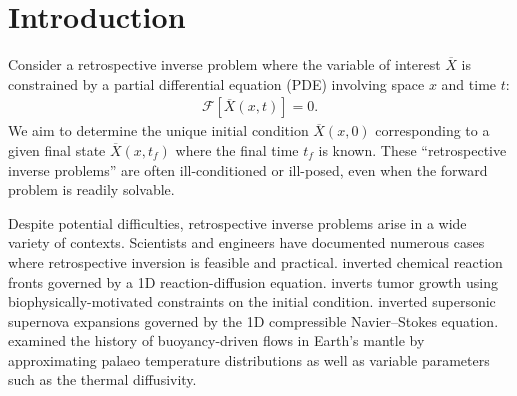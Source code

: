 \documentclass[%
 reprint,
 amsmath,amssymb,
 aps,
 pre,
]{revtex4-2}
\begin{document}
\maketitle

\section{Introduction}\label{secintro}

Consider a retrospective inverse problem where the variable of interest $\overline{X}$ is constrained by a partial differential equation (PDE) involving space $x$ and time $t$:
\begin{align}
  \mathcal{F}[\overline{X}(x, t)] = 0 \label{genintro}.
\end{align}
We aim to determine the unique initial condition $\overline{X}(x, 0)$ corresponding to a given final state $\overline{X}(x, t_f)$ where the final time $t_f$ is known.
These ``retrospective inverse problems'' are often ill-conditioned or ill-posed, even when the forward problem is readily solvable.

Despite potential difficulties, retrospective inverse problems arise in a wide variety of contexts.
Scientists and engineers have documented numerous cases where retrospective inversion is feasible and practical.
\cite{Lukyanenko2021} inverted chemical reaction fronts governed by a 1D reaction-diffusion equation.
\cite{Subramanian2020} inverts tumor growth using biophysically-motivated constraints on the initial condition.
\cite{Kabanikhin2020} inverted supersonic supernova expansions governed by the 1D compressible Navier--Stokes equation.
\cite{Liu2008, Li2017} examined the history of buoyancy-driven flows in Earth's mantle by approximating palaeo temperature distributions as well as variable parameters such as the thermal diffusivity.
\end{document}
